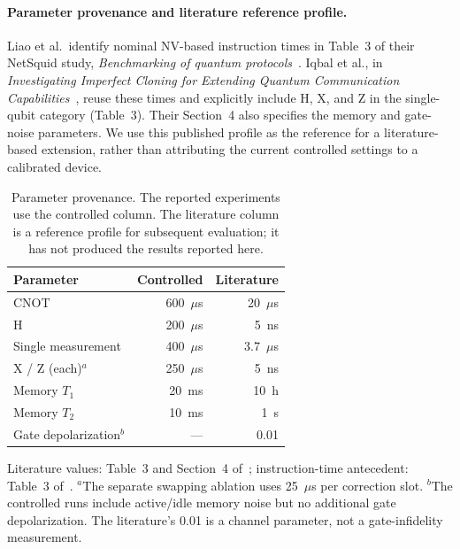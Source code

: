 \paragraph{Parameter provenance and literature reference profile.}
Liao et al.\ identify nominal NV-based instruction times in
Table~3 of their NetSquid study, \emph{Benchmarking of quantum
protocols}~\cite{liao2022benchmarking}.
Iqbal et al., in \emph{Investigating Imperfect Cloning for Extending
Quantum Communication Capabilities}~\cite{iqbal2023cloning}, reuse these
times and explicitly include H, X, and Z in the single-qubit category
(Table~3). Their Section~4 also specifies the memory and gate-noise
parameters. We use this published profile as the reference for a
literature-based extension, rather than attributing the current
controlled settings to a calibrated device.

\begin{table}[t]
\centering
\caption{Parameter provenance. The reported experiments use the controlled
column. The literature column is a reference profile for subsequent
evaluation; it has not produced the results reported here.}
\label{tab:qucl-physical-profile}
\small
\begin{tabular}{@{}lrr@{}}
\toprule
Parameter & Controlled & Literature \\
\midrule
CNOT & 600~$\mu$s & 20~$\mu$s \\
H & 200~$\mu$s & 5~ns \\
Single measurement & 400~$\mu$s & 3.7~$\mu$s \\
X / Z (each)$^{a}$ & 250~$\mu$s & 5~ns \\
Memory $T_1$ & 20~ms & 10~h \\
Memory $T_2$ & 10~ms & 1~s \\
Gate depolarization$^{b}$ & --- & 0.01 \\
\bottomrule
\end{tabular}
\par\smallskip
\begin{minipage}{\columnwidth}
\footnotesize
Literature values: Table~3 and Section~4 of~\cite{iqbal2023cloning};
instruction-time antecedent: Table~3 of~\cite{liao2022benchmarking}.
$^{a}$The separate swapping ablation uses 25~$\mu$s per correction slot.
$^{b}$The controlled runs include active/idle memory noise but no
additional gate depolarization. The literature's 0.01 is a channel
parameter, not a gate-infidelity measurement.
\end{minipage}
\end{table}

